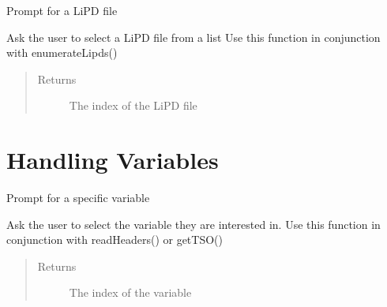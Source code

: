 \documentclass[letterpaper,10pt,english]{sphinxmanual}
\begin{document}

\begin{fulllineitems}
\label{\detokenize{LipdUtils:pyleoclim.LipdUtils.promptForLipd}}
Prompt for a LiPD file

Ask the user to select a LiPD file from a list
Use this function in conjunction with enumerateLipds()
\begin{quote}\begin{description}
\item[{Returns}] \leavevmode
The index of the LiPD file

\end{description}\end{quote}

\end{fulllineitems}



\section{Handling Variables}
\label{\detokenize{LipdUtils:handling-variables}}

\begin{fulllineitems}
\label{\detokenize{LipdUtils:pyleoclim.LipdUtils.promptForVariable}}
Prompt for a specific variable

Ask the user to select the variable they are interested in.
Use this function in conjunction with readHeaders() or getTSO()
\begin{quote}\begin{description}
\item[{Returns}] \leavevmode
The index of the variable

\end{description}\end{quote}

\end{fulllineitems}

\end{document}
